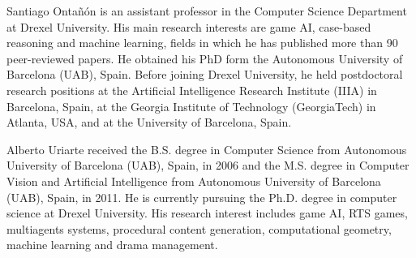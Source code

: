 \documentclass[journal]{IEEEtran}
\begin{document}



\ifCLASSOPTIONcaptionsoff
  \newpage
\fi

                                                    




\begin{IEEEbiographynophoto}{Santiago Onta\~{n}\'{o}n}
is an assistant professor in the Computer Science Department at Drexel University. His main research interests are game AI, case-based reasoning and machine learning, fields in which he has published more than 90 peer-reviewed papers. He obtained his PhD form the Autonomous University of Barcelona (UAB), Spain. Before joining Drexel University, he held postdoctoral research positions at the Artificial Intelligence Research Institute (IIIA) in Barcelona, Spain, at the Georgia Institute of Technology (GeorgiaTech) in Atlanta, USA, and at the University of Barcelona, Spain.  
\end{IEEEbiographynophoto}

\begin{IEEEbiographynophoto}{Alberto Uriarte}
received the B.S. degree in Computer Science from Autonomous University of Barcelona (UAB), Spain, in 2006 and the M.S. degree in Computer Vision and Artificial Intelligence from Autonomous University of Barcelona (UAB), Spain, in 2011. He is currently pursuing the Ph.D. degree in computer science at Drexel University. His research interest includes game AI, RTS games, multiagents systems, procedural content generation, computational geometry, machine learning and drama management.  
\end{IEEEbiographynophoto}
\end{document}
